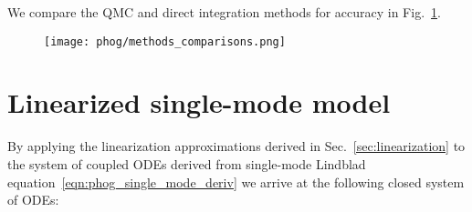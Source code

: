 We compare the QMC and direct integration methods for accuracy in Fig.~\ref{fig:appendix_numerical_methods_comparisons}.

\begin{figure}[htp]
\centering
\texttt{[image: phog/methods\_comparisons.png]}
\caption{\label{fig:appendix_numerical_methods_comparisons}}
\end{figure}




\section{Linearized single-mode model}\label{appendix:single_mode_linear}
By applying the linearization approximations derived in Sec.~\ref{sec:linearization} to the system of coupled ODEs derived from single-mode Lindblad equation~\ref{eqn:phog_single_mode_deriv} we arrive at the following closed system of ODEs:


